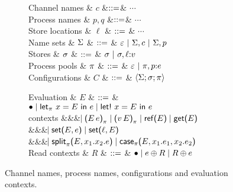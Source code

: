 \begin{figure*}[t]
\centering
\begin{subfigure}{0.35\textwidth}
\begin{grammar}
  Channel names & $c$   &$\mathrel{::=}$& $\cdots$
  \\
  Process names & $p,q$ &$\mathrel{::=}$& $\cdots$
  \\
  Store locations & $\ell$ & $\mathrel{::=}$ & $\cdots$
  \\[1mm]
  Name sets
  & $\Sigma$ 
    & $\mathrel{::=}$ & $\varepsilon ~|~ \Sigma, c ~|~ \Sigma, p$
  \\
  Stores & $\sigma$ & $\mathrel{::=}$ & $\sigma ~|~ \sigma, \ell{:}v$
  \\
  Process pools
  & $\pi$ 
    & $\mathrel{::=}$ & $\varepsilon ~|~ \pi, p{:}e$
    \\[1mm]
  Configurations
  & $C$
     & $\mathrel{::=}$ & $\left<\Sigma;\sigma;\pi\right> $
     \\[1mm]
\end{grammar}
\end{subfigure}%
\begin{subfigure}{0.5\textwidth}
\begin{grammar}
 Evaluation
  & $E$
     & $\mathrel{::=}$ & 
 $\bullet \mathrel{\mid} \text{\textsf{let}}_{\pi}\ {x} = {E}\ \text{\textsf{in}}\ {e} \mathrel{\mid} \text{\textsf{let!}}\ {x} = {E}\ \text{\textsf{in}}\ {e}$
\\ contexts &&& $\hspace{-1.02ex}\mathrel{\mid} \textsf{(} E\,e\textsf{)}_{\pi} \mathrel{\mid} \textsf{(} v\,E\textsf{)}_{\pi} \mathrel{\mid} \text{\textsf{ref}}\textsf{(}{E}\textsf{)} \mathrel{\mid} \text{\textsf{get}}\textsf{(}{E}\textsf{)}$
     \\ &&& $\hspace{-1.02ex}\mathrel{\mid} \text{\textsf{set}}\textsf{(}{E},{e}\textsf{)} \mathrel{\mid} \text{\textsf{set}}\textsf{(}{\ell},{E}\textsf{)}$
\\ &&& $\hspace{-1.02ex}\mathrel{\mid} \text{\textsf{split}}_{\pi}\textsf{(}{E},{x_1}.{x_2}.{e}\textsf{)} \mathrel{\mid} \text{\textsf{case}}_{\pi}\textsf{(}{E},{x_1}.{e_1},{x_2}.{e_2}\textsf{)}$
\\[1mm]
 Read contexts
  & $R$
     & $\mathrel{::=}$ & $\bullet \mathrel{\mid} e \oplus R \mathrel{\mid} R \oplus e$
\end{grammar}
\end{subfigure}
\caption{Channel names, process names, configurations and evaluation contexts.}
\label{fig:configs}
\end{figure*}

